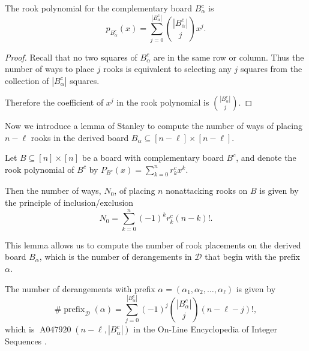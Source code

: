 \begin{lemma}
  The rook polynomial for the complementary board $B_\alpha^c$ is \begin{equation}
    p_{B_\alpha^c}(x) = \sum_{j = 0}^{|B_\alpha^c|} \binom{|B_\alpha^c|}{j}x^j.
  \end{equation}
\end{lemma}
\begin{proof}
  Recall that no two squares of $B^c_\alpha$ are in the same row or column.
  Thus the number of ways to place $j$ rooks is equivalent to selecting any
  $j$ squares from the collection of $|B^c_\alpha|$ squares.

  Therefore the coefficient of $x^j$ in the rook polynomial is
  $\binom{|B_\alpha^c|}{j}$.
\end{proof}

Now we introduce a lemma of Stanley \cite{Stanley2011EC1} to compute the number
of ways of placing $n - \ell$ rooks in the derived board
$B_\alpha \subseteq [n - \ell] \times [n - \ell]$.

\begin{lemma}
  Let $B \subseteq [n] \times [n]$ be a board with complementary board $B^c$,
  and denote the rook polynomial of $B^c$ by
  $P_{B^c}(x) = \sum_{k=0}^n r^c_k x^k$.

  Then the number of ways, $N_0$, of placing $n$ nonattacking rooks on $B$
  is given by the principle of inclusion/exclusion
  \begin{equation}
    N_0 = \sum_{k=0}^n (-1)^k r^c_k (n-k)!.
  \end{equation}
  \label{lemma:CountsFromComplementaryPolynomials}
\end{lemma}

This lemma allows us to compute the number of rook placements on the derived
board $B_\alpha$, which is the number of derangements in $\mathcal{D}$ that
begin with the prefix $\alpha$.
\begin{corollary}
  The number of derangements with prefix
  $\alpha = (\alpha_1, \alpha_2, \dots, \alpha_\ell)$
  is given by \begin{equation}
    \#\operatorname{prefix}_\mathcal{D}(\alpha)
    = \sum_{j=0}^{|B_\alpha^c|} (-1)^j \binom{|B_\alpha^c|}{j}(n-\ell-j)!,
  \end{equation} which is $\operatorname{A047920}(n-\ell, |B_\alpha^c|)$ in
  the On-Line Encyclopedia of Integer Sequences \cite{oeis}.
\label{cor:derangementsWithPrefix}
\end{corollary}

